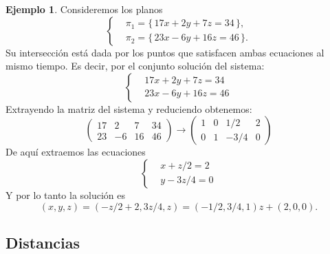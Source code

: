 \documentclass[12pt]{article}
\theoremstyle{plain}
\theoremstyle{definition}
\newtheorem{Ex}[Th]{Ejemplo}           %
\theoremstyle{remark}
\renewcommand{\:}{\colon}           %
\renewcommand{\.}{\Cdot}                %
\newcommand{\set}[1]{\{\,#1\,\}}    %
\begin{document}
\begin{multicols}{2}
\begin{Ex}
  Consideremos los planos 
  $$
\left\lbrace
\begin{aligned}
  &\pi_1=\set{17x+2y+7z=34},\\
  &\pi_2=\set{23x-6y+16z=46}.
\end{aligned}
\right.
$$
Su intersección está dada por los puntos que satisfacen ambas ecuaciones al mismo tiempo. Es decir, por el conjunto solución del sistema:
$$
\left\lbrace
\begin{aligned}
  &17x+2y+7z=34\\
  &23x-6y+16z=46
\end{aligned}
\right.
$$
Extrayendo la matriz del sistema y reduciendo obtenemos:
$$\left(\begin{array}{ccc|c}
  17&2&7&34\\
  23&-6&16&46
\end{array}\right)\to\left(\begin{array}{ccc|c}
  1&0&1/2&2\\
  0&1&-3/4&0
\end{array}\right)$$
De aquí extraemos las ecuaciones 
$$
\left\lbrace
\begin{aligned}
  &x+z/2=2\\
  &y-3z/4=0
\end{aligned}
\right.
$$
Y por lo tanto la solución es
$$(x,y,z)=\left(-z/2+2,3z/4,z\right)=\left(-1/2,3/4,1\right)z+(2,0,0).$$
\end{Ex}

\subsection*{Distancias}
\end{multicols}
\end{document}
